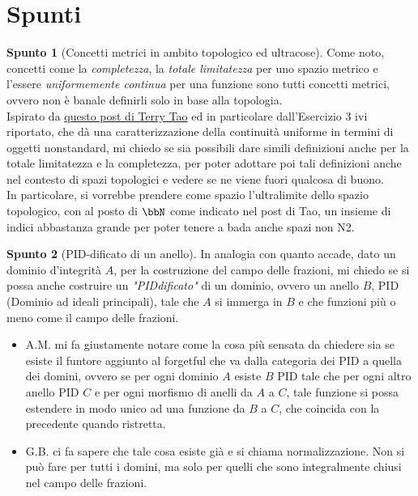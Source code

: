 \documentclass[a4paper,NoNotes,GeneralMath]{stdmdoc}
\theoremstyle{definition}
\newtheorem{spunto}{Spunto}
\begin{document}
	\section {Spunti}
	\begin{spunto}[Concetti metrici in ambito topologico ed ultracose]
		Come noto, concetti come la {\it completezza}, la {\it totale limitatezza} per uno spazio metrico e l'essere {\it uniformemente continua} per una funzione sono tutti concetti metrici, ovvero non è banale definirli solo in base alla topologia. \\
		Ispirato da \href{https://terrytao.wordpress.com/2012/04/02/a-cheap-version-of-nonstandard-analysis/}{questo post di Terry Tao} ed in particolare dall'Esercizio 3 ivi riportato, che dà una caratterizzazione della continuità uniforme in termini di oggetti nonstandard, mi chiedo se sia possibili dare simili definizioni anche per la totale limitatezza e la completezza, per poter adottare poi tali definizioni anche nel contesto di spazi topologici e vedere se ne viene fuori qualcosa di buono. \\
		In particolare, si vorrebbe prendere come spazio l'ultralimite dello spazio topologico, con al posto di $\bbN$ come indicato nel post di Tao, un insieme di indici abbastanza grande per poter tenere a bada anche spazi non N2.
	\end{spunto}
	
	\begin{spunto}[PID-dificato di un anello]
		In analogia con quanto accade, dato un dominio d'integrità $A$, per la costruzione del campo delle frazioni, mi chiedo se si possa anche costruire un {\it "PIDdificato"} di un dominio, ovvero un anello $B$, PID (Dominio ad ideali principali), tale che $A$ si immerga in $B$ e che funzioni più o meno come il campo delle frazioni.
		\begin{itemize}
			\item A.M. mi fa giustamente notare come la cosa più sensata da chiedere sia se esiste il funtore aggiunto al forgetful che va dalla categoria dei PID a quella dei domini, ovvero se per ogni dominio $A$ esiste $B$ PID tale che per ogni altro anello PID $C$ e per ogni morfismo di anelli da $A$ a $C$, tale funzione si possa estendere in modo unico ad una funzione da $B$ a $C$, che coincida con la precedente quando ristretta.
			\item G.B. ci fa sapere che tale cosa esiste già e si chiama normalizzazione. Non si può fare per tutti i domini, ma solo per quelli che sono integralmente chiusi nel campo delle frazioni.
		\end{itemize}
	\end{spunto}
	
\end{document}
